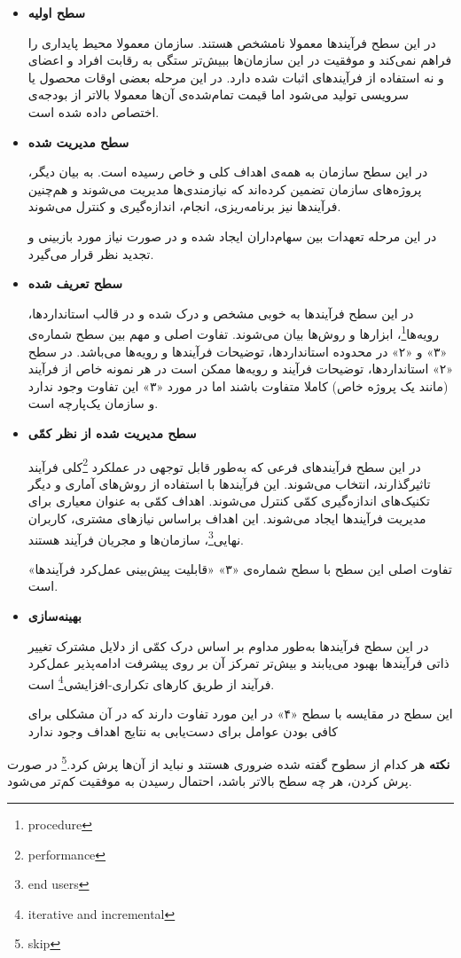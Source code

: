 \begin{itemize}
	\item 
	\textbf{سطح اولیه}
	
	در این سطح فرآیند‌ها معمولا نامشخص هستند. سازمان معمولا محیط پایداری را فراهم نمی‌کند و موفقیت در این سازمان‌ها ببیش‌تر ستگی به رقابت افراد و اعضای و نه استفاده از فرآیند‌های اثبات شده دارد. در این مرحله بعضی اوقات محصول یا سرویسی تولید می‌شود اما  قیمت تمام‌شده‌ی آن‌ها معمولا بالاتر از بودجه‌ی اختصاص داده شده است.
	\item 
	\textbf{سطح مدیریت شده}
	
	در این سطح سازمان به همه‌ی اهداف کلی و خاص رسیده است. به بیان دیگر، پروژه‌های سازمان تضمین کرده‌اند که نیازمندی‌ها مدیریت می‌شوند و هم‌چنین فرآیندها نیز برنامه‌ریزی، انجام، اندازه‌گیری و کنترل می‌شوند.
	
	در این مرحله تعهدات بین سهام‌داران ایجاد شده و در صورت نیاز مورد بازبینی و تجدید نظر قرار می‌گیرد.
	
	\item
	\textbf{سطح تعریف شده}
	
	در این سطح فرآیندها به خوبی مشخص و درک شده و در قالب استاندارد‌ها، رویه‌ها\footnote{procedure}، ابزارها و روش‌ها بیان می‌شوند.
	تفاوت اصلی و مهم بین سطح شماره‌ی «۳» و «۲» در محدوده استانداردها، توضیحات فرآیندها و رویه‌ها می‌باشد. در سطح «۲» استانداردها، توضیحات فرآیند و رویه‌ها ممکن است در هر نمونه خاص از فرآیند (مانند یک پروژه خاص) کاملا متفاوت باشند اما در مورد «۳» این تفاوت وجود ندارد و سازمان یک‌پارچه است.
	
	\item 
	\textbf{سطح مدیریت شده از نظر کمّی}
	
	در این سطح فرآیندهای فرعی که به‌طور قابل توجهی در عملکرد \footnote{performance}کلی فرآیند تاثیرگذارند، انتخاب می‌شوند. این فرآیندها با استفاده از روش‌های آماری و دیگر تکنیک‌های اندازه‌گیری کمّی کنترل می‌شوند. اهداف کمّی به عنوان معیاری برای مدیریت فرآیند‌ها ایجاد می‌شوند. این اهداف براساس نیازهای مشتری، کاربران نهایی\footnote{end users}، سازمان‌ها و مجریان فرآیند هستند.
	
	تفاوت اصلی این سطح با سطح شماره‌ی «۳» «قابلیت پیش‌بینی عمل‌کرد فرآیندها» است.
	
	\item 
	\textbf{بهینه‌سازی}
	
	در این سطح فرآیند‌ها به‌طور مداوم بر اساس درک کمّی از دلایل مشترک تغییر ذاتی فرآیند‌ها بهبود می‌یابند و بیش‌تر تمرکز آن بر روی پیشرفت ادامه‌پذیر عمل‌کرد فرآیند از طریق کارهای تکراری-افزایشی\footnote{iterative and incremental} است.
	
	این سطح در مقایسه با سطح «۴» در این مورد تفاوت دارند که در آن مشکلی  برای کافی بودن عوامل برای دست‌یابی به نتایج  اهداف وجود ندارد
\end{itemize}

\textbf{نکته} هر کدام از سطوح گفته شده ضروری هستند و نباید از آن‌ها پرش کرد.\footnote{skip} در صورت پرش کردن، هر چه سطح بالاتر باشد، احتمال رسیدن به موفقیت کم‌تر می‌شود.